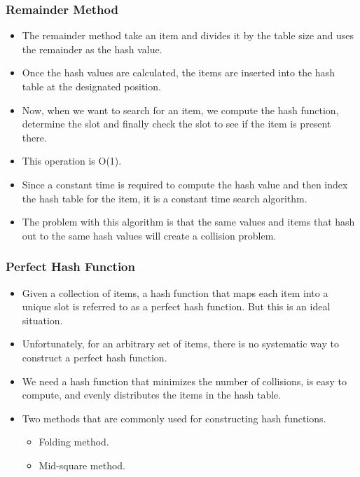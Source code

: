\documentclass{beamer}
\begin{document}
\begin{frame}
\frametitle{Remainder Method}
\begin{itemize}
\item The remainder method take an item and divides it by the table size and uses the remainder as the hash value.
\item Once the hash values are calculated, the items are inserted into the hash table at the designated position.
\item Now, when we want to search for an item, we compute the hash function, determine the slot and finally check the slot to see if the item is present there.
\item This operation is O(1).
\item Since a constant time is required to compute the hash value and then index the hash table for the item, it is a constant time search algorithm.
\item The problem with this algorithm is that the same values and items that hash out to the same hash values will create a collision problem.
\end{itemize}
\end{frame}

\begin{frame}
\frametitle{Perfect Hash Function}
\begin{itemize}
\item Given a collection of items, a hash function that maps each item into a unique slot is referred to as a perfect hash function. But this is an ideal situation.
\item Unfortunately, for an arbitrary set of items, there is no systematic way to construct a perfect hash function.
\item We need a hash function that minimizes the number of collisions, is easy to compute,
and evenly distributes the items in the hash table.
\item Two methods that are commonly used for constructing hash functions.
\begin{itemize}
\item Folding method.
\item Mid-square method.
\end{itemize}

\end{itemize}
\end{frame}
\end{document}
